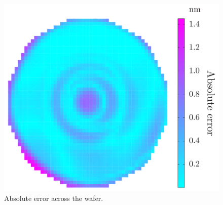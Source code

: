 \begin{figure}
  \centering
  \includegraphics[width=0.6\linewidth]{include/figures/wafer-qoi-error.pdf}
  \caption{Absolute error across the wafer.}
\end{figure}
